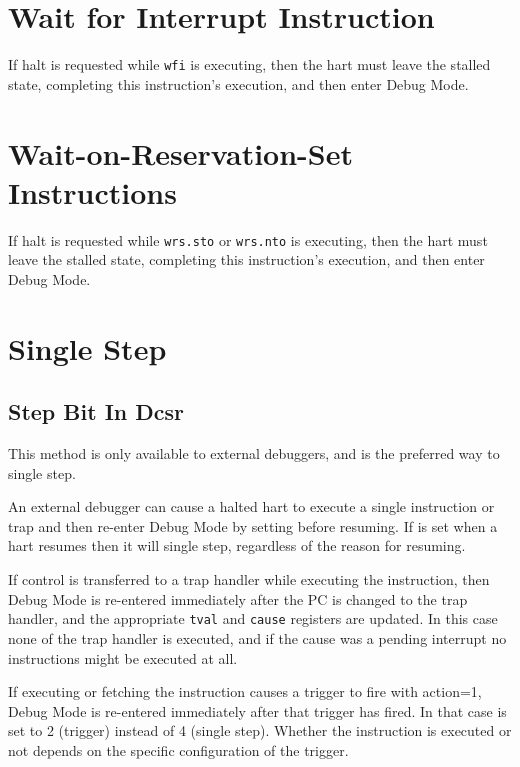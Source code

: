 \section{Wait for Interrupt Instruction}

If halt is requested while {\tt wfi} is executing, then the hart must leave the
stalled state, completing this instruction's execution, and then enter Debug
Mode.

\section{Wait-on-Reservation-Set Instructions}

If halt is requested while {\tt wrs.sto} or {\tt wrs.nto} is executing, then the
hart must leave the stalled state, completing this instruction's execution, and
then enter Debug Mode.

\section{Single Step}

\subsection{Step Bit In Dcsr} \label{stepBit}

This method is only available to external debuggers, and is the preferred way
to single step.

An external debugger can cause a halted hart to execute a single instruction or
trap and then re-enter Debug Mode by setting \FcsrDcsrStep before resuming.  If
\FcsrDcsrStep is set when a hart resumes then it will single step, regardless
of the reason for resuming.

If control is transferred to a trap handler while executing the instruction,
then Debug Mode is re-entered immediately after the PC is changed to the trap
handler, and the appropriate {\tt tval} and {\tt cause} registers are updated.
In this case none of the trap handler is executed, and if the cause was a
pending interrupt no instructions might be executed at all.

If executing or fetching the instruction causes a trigger to fire with action=1, Debug Mode
is re-entered immediately after that trigger has fired. In that case \FcsrDcsrCause is
set to 2 (trigger) instead of 4 (single step).  Whether the instruction is
executed or not depends on the specific configuration of the trigger.

